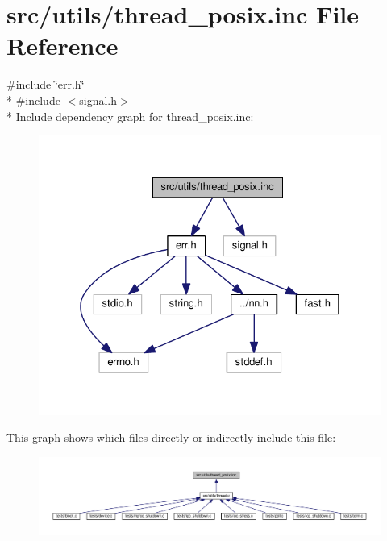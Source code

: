 \hypertarget{thread__posix_8inc}{}\section{src/utils/thread\+\_\+posix.inc File Reference}
\label{thread__posix_8inc}
{\ttfamily \#include \char`\"{}err.\+h\char`\"{}}\\*
{\ttfamily \#include $<$signal.\+h$>$}\\*
Include dependency graph for thread\+\_\+posix.\+inc\+:\nopagebreak
\begin{figure}[H]
\begin{center}
\leavevmode
\includegraphics[width=328pt]{thread__posix_8inc__incl}
\end{center}
\end{figure}
This graph shows which files directly or indirectly include this file\+:
\nopagebreak
\begin{figure}[H]
\begin{center}
\leavevmode
\includegraphics[width=350pt]{thread__posix_8inc__dep__incl}
\end{center}
\end{figure}
